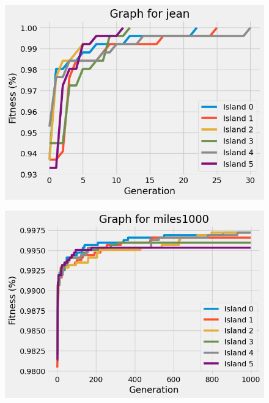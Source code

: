 \documentclass{article}
\begin{document}
\begin{multicols}{2}
\begin{figure}[H]
\end{figure}
\begin{figure}[H]
    \centering
    \includegraphics[scale=0.45]{imgs/convergence/jean_evolution.png}
\end{figure}
\begin{figure}[H]
    \centering
    \includegraphics[scale=0.45]{imgs/convergence/miles1000_evolution.png}
\end{figure}
\begin{figure}[H]
    \centering

\end{figure}
\end{multicols}
\end{document}
